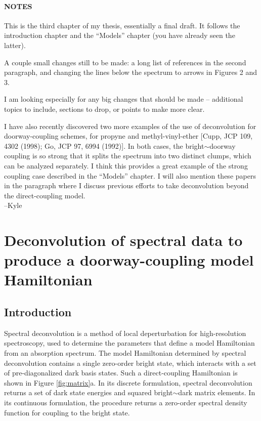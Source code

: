 \documentclass[12pt]{mitthesis}
\begin{document}
\tableofcontents
\clearpage

\subsubsection*{NOTES}

This is the third chapter of my thesis, essentially a final draft.  It
follows the introduction chapter and the ``Models'' chapter (you
have already seen the latter).

A couple small changes still to be made: a long list of references in
the second paragraph, and changing the lines below the spectrum to
arrows in Figures 2 and 3.

I am looking especially for any big changes that should be made --
additional topics to include, sections to drop, or points to make more
clear.

I have also recently discovered two more examples of the use of
deconvolution for doorway-coupling schemes, for propyne and
methyl-vinyl-ether [Cupp, JCP 109, 4302 (1998); Go, JCP 97, 6994
(1992)].  In both cases, the bright$\sim$doorway coupling is so strong
that it splits the spectrum into two distinct clumps, which can be
analyzed separately.  I think this provides a great example of the
strong coupling case described in the ``Models'' chapter.  I will also
mention these papers in the paragraph where I discuss previous efforts
to take deconvolution beyond the direct-coupling model.\\

--Kyle

\clearpage
\setcounter{chapter}{2}
\chapter{Deconvolution of spectral data to produce a doorway-coupling
  model Hamiltonian}

\section{Introduction}

Spectral deconvolution is a method of local deperturbation for
high-resolution spectroscopy, used to determine the parameters that
define a model Hamiltonian from an absorption spectrum.  The model
Hamiltonian determined by spectral deconvolution contains a single
zero-order bright state, which interacts with a set of
pre-diagonalized dark basis states.  Such a direct-coupling
Hamiltonian is shown in Figure \ref{fig:matrix}a.  In its discrete
formulation, spectral deconvolution returns a set of dark state
energies and squared bright$\sim$dark matrix elements.  In its
continuous formulation, the procedure returns a zero-order spectral
density function for coupling to the bright state.
\end{document}
